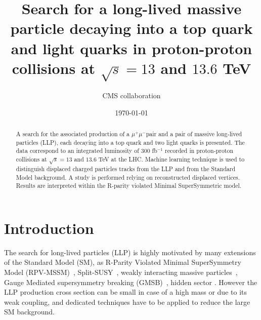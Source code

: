 \documentclass{cernatlasnote}
\title{\centering
Search for a long-lived massive particle decaying into a top quark and light quarks in proton-proton collisions at $\sqrt{s} = 13$ and $13.6$ TeV
}
\author{CMS collaboration}
\date{\today}
\newcommand{\mumu}{\ensuremath{\mu^{+}\mu^{-}}}
\newcommand{\fbinv}{\! fb$^{-1}$\xspace}
\begin{document}
\maketitle

\begin{abstract}

A search for the associated production of a \mumu pair and a pair of massive long-lived particles (LLP), each decaying into a top quark and two light quarks is presented. The data correspond to an integrated luminosity of 300\fbinv recorded in proton-proton collisions at $\sqrt{s} = 13$ and $13.6$ TeV at the LHC. Machine learning technique is used to distinguish displaced charged particles tracks from the LLP and from the Standard Model background. A study is performed relying on reconstructed displaced vertices. Results are interpreted within the R-parity violated Minimal SuperSymmetric model. 
\end{abstract}

\vfill
\makereviewtable
\clearpage



\section{Introduction}
\label{SEC: INTRO}
The search for long-lived particles (LLP) is highly motivated by many extensions of the Standard Model (SM), as R-Parity Violated Minimal SuperSymmetry Model (RPV-MSSM)~\cite{RPV1, RPV2, RPV3, RPV4}, Split-SUSY~\cite{SPLITSUSY, SPLITSUSY2, SPLITSUSY3, SPLITSUSY4, SPLITSUSY5, SPLITSUSY6}, weakly interacting massive particles~\cite{WIMP1,WIMP2,WIMP3}, Gauge Mediated supersymmetry breaking (GMSB)~\cite{GMSB1,GMSB2, GMSB3}, hidden sector \cite{HS1, HS2, HS3}. However the LLP production cross section can be small in case of a high mass or due to its weak coupling, and dedicated techniques have to be applied to reduce the large SM background.
\end{document}
